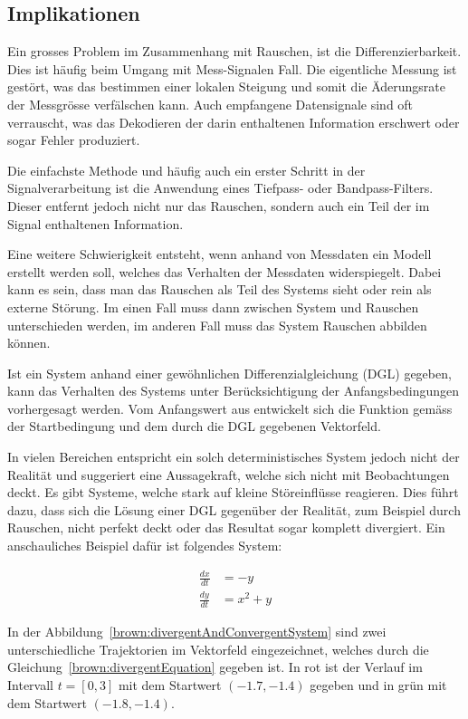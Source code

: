 \subsection{Implikationen\label{brown:Rauschen:Implikationen}}

Ein grosses Problem im Zusammenhang mit Rauschen, ist die Differenzierbarkeit. Dies ist häufig beim Umgang mit Mess-Signalen Fall. Die eigentliche Messung ist gestört, was das bestimmen einer lokalen Steigung und somit die Äderungsrate der Messgrösse verfälschen kann. Auch empfangene Datensignale sind oft verrauscht, was das Dekodieren der darin enthaltenen Information erschwert oder sogar Fehler produziert.

Die einfachste Methode und häufig auch ein erster Schritt in der Signalverarbeitung ist die Anwendung eines Tiefpass- oder Bandpass-Filters. Dieser entfernt jedoch nicht nur das Rauschen, sondern auch ein Teil der im Signal enthaltenen Information.

Eine weitere Schwierigkeit entsteht, wenn anhand von Messdaten ein Modell erstellt werden soll, welches das Verhalten der Messdaten widerspiegelt. Dabei kann es sein, dass man das Rauschen als Teil des Systems sieht oder rein als externe Störung. Im einen Fall muss dann zwischen System und Rauschen unterschieden werden, im anderen Fall muss das System Rauschen abbilden können.

Ist ein System anhand einer gewöhnlichen Differenzialgleichung (DGL) gegeben, kann das Verhalten des Systems unter Berücksichtigung der Anfangsbedingungen vorhergesagt werden. Vom Anfangswert aus entwickelt sich die Funktion gemäss der Startbedingung und dem durch die DGL gegebenen Vektorfeld. 

In vielen Bereichen entspricht ein solch deterministisches System jedoch nicht der Realität und suggeriert eine Aussagekraft, welche sich nicht mit Beobachtungen deckt. Es gibt Systeme, welche stark auf kleine Störeinflüsse reagieren. Dies führt dazu, dass sich die Lösung einer DGL gegenüber der Realität, zum Beispiel durch Rauschen, nicht perfekt deckt oder das Resultat sogar komplett divergiert. Ein anschauliches Beispiel dafür ist folgendes System:

\begin{align}
	\frac{dx}{dt} &= -y \\
	\frac{dy}{dt} &= x^2 + y
	\label{brown:divergentEquation}
\end{align}

In der Abbildung~\ref{brown:divergentAndConvergentSystem} sind zwei unterschiedliche Trajektorien im Vektorfeld eingezeichnet, welches durch die Gleichung~\ref{brown:divergentEquation} gegeben ist. In rot ist der Verlauf im Intervall  $ t = [0, 3] $ mit dem Startwert $ (-1.7, -1.4) $ gegeben und in grün mit dem Startwert $ (-1.8, -1.4) $.

